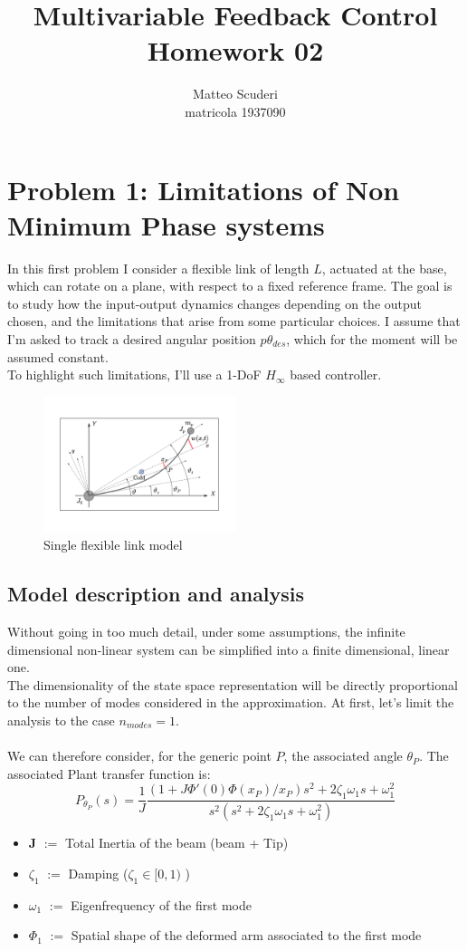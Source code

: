 \documentclass[a4paper, 12pt]{article}
\title{Multivariable Feedback Control \\ Homework 02}
\author{Matteo Scuderi\\ matricola 1937090}
\date{}
\def\FigureOne{\centering\includegraphics[width=0.5\textwidth]{Figures/fig01.pdf}}
\begin{document}
\maketitle

\section{Problem 1: Limitations of Non Minimum Phase systems}

In this first problem I consider a flexible link of length $L$, actuated at the base, which can rotate on a plane, with respect to a fixed reference frame. The goal is to study how the input-output dynamics changes depending on the output chosen, and the limitations that arise from some particular choices. I assume that I'm asked to track a desired angular position $p\theta_{des}$, which for the moment will be assumed constant.\\
To highlight such limitations, I'll use a 1-DoF $H_\infty$ based controller.\\

\begin{figure}[h!]
    \FigureOne
    \caption{Single flexible link model}
    \label{fig:fig01}
\end{figure}

\subsection{Model description and analysis}
\label{sec:ModelDescription}
Without going in too much detail, under some assumptions, the infinite dimensional non-linear system can be simplified into a finite dimensional, linear one.\\
The dimensionality of the state space representation will be directly proportional to the number of modes considered in the approximation. At first, let's limit the analysis to the case $n_{modes} = 1$.\\\\
We can therefore consider, for the generic point $P$, the associated angle $\theta_P$. The associated Plant transfer function is:
\begin{equation}
        P_{\theta_P}(s) =\frac{1}{J} \frac{(1+J\Phi'(0)\Phi(x_P)/x_P) s^2 + 2\zeta_1\omega_1 s + \omega_1^2}
        {s^2 (s^2 + 2\zeta_1\omega_1 s + \omega_1^2)}
\label{eq:Model}
\end{equation}
\begin{itemize}
\item \textbf{J} $:=$ Total Inertia of the beam (beam + Tip)
\item \textbf{$\zeta_1$} $:=$ Damping ($\zeta_1 \in [0,1)$ )
\item \textbf{$\omega_1$} $:=$ Eigenfrequency of the first mode
\item   \textbf{$\Phi_1$} $:=$ Spatial shape of the deformed arm associated to the first mode 
\end{itemize}
\end{document}

